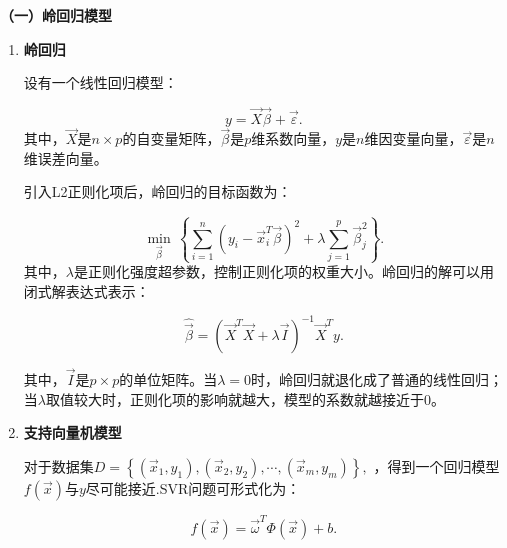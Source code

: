 \textbf{（一）岭回归模型}

\begin{enumerate}
    \item \textbf{岭回归}
      
    设有一个线性回归模型：
    
    \begin{equation}
        y=\overrightarrow{X}\overrightarrow{\beta }+\overrightarrow{\varepsilon }.
    \end{equation}
    其中，$\overrightarrow{X}$是$n\times p$的自变量矩阵，$\overrightarrow{\beta }$是$p$维系数向量，$y$是$n$维因变量向量，$\overrightarrow{\varepsilon }$是$n$维误差向量。
    
    引入L2正则化项后，岭回归的目标函数为：
    
    \begin{equation}
        \underset{\overrightarrow{\beta }}{\mathop{\min }}\,\left\{ \sum\limits_{i=1}^{n}{{{\left( {{y}_{i}}-\overrightarrow{x}_{i}^{T}\overrightarrow{\beta } \right)}^{2}}+\lambda \sum\limits_{j=1}^{p}{\overrightarrow{\beta }_{j}^{2}}} \right\}.
    \end{equation}
    其中，$\lambda$是正则化强度超参数，控制正则化项的权重大小。岭回归的解可以用闭式解表达式表示：
    
    \begin{equation}
        \widehat{\overrightarrow{\beta }}={{\left( {{\overrightarrow{X}}^{T}}\overrightarrow{X}+\lambda \overrightarrow{I} \right)}^{-1}}{{\overrightarrow{X}}^{T}}y.
    \end{equation}
     
    其中，$\overrightarrow{I}$是$p\times p$的单位矩阵。当$\lambda =0$时，岭回归就退化成了普通的线性回归；当$\lambda$取值较大时，正则化项的影响就越大，模型的系数就越接近于0。



    \item \textbf{支持向量机模型}
    
    对于数据集$D=\left\{ \left( {{\overrightarrow{x}}_{1}},{{y}_{1}} \right),\left( {{\overrightarrow{x}}_{2}},{{y}_{2}} \right),\cdots ,\left( {{\overrightarrow{x}}_{m}},{{y}_{m}} \right) \right\},$ ，得到一个回归模型$f\left( \overrightarrow{x} \right)$与$y$尽可能接近.SVR问题可形式化为：
    
    \begin{equation}
        f\left( \overrightarrow{x} \right)={{\overrightarrow{\omega }}^{T}}\Phi \left( \overrightarrow{x} \right)+b.
    \end{equation}
    

\end{enumerate}
